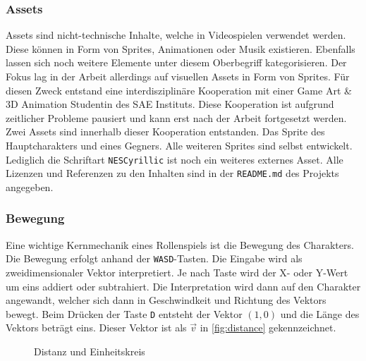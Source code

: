 \subsubsection{Assets}
Assets sind nicht-technische Inhalte, welche in Videospielen verwendet werden.
Diese können in Form von Sprites, Animationen oder Musik existieren.
Ebenfalls lassen sich noch weitere Elemente unter diesem Oberbegriff kategorisieren.
Der Fokus lag in der Arbeit allerdings auf visuellen Assets in Form von Sprites.
Für diesen Zweck entstand eine interdisziplinäre Kooperation mit einer Game Art \& 3D Animation Studentin des SAE Instituts\cite{sae-institute}.
Diese Kooperation ist aufgrund zeitlicher Probleme pausiert und kann erst nach der Arbeit fortgesetzt werden.
Zwei Assets sind innerhalb dieser Kooperation entstanden.
Das Sprite des Hauptcharakters und eines Gegners.
Alle weiteren Sprites sind selbst entwickelt.
Lediglich die Schriftart \texttt{NESCyrillic} ist noch ein weiteres externes Asset.
Alle Lizenzen und Referenzen zu den Inhalten sind in der \texttt{README.md} des Projekts angegeben.

\subsubsection{Bewegung}
Eine wichtige Kernmechanik eines Rollenspiels ist die Bewegung des Charakters.
Die Bewegung erfolgt anhand der \texttt{WASD}-Tasten.
Die Eingabe wird als zweidimensionaler Vektor interpretiert.
Je nach Taste wird der X- oder Y-Wert um eins addiert oder subtrahiert.
Die Interpretation wird dann auf den Charakter angewandt, welcher sich dann in Geschwindkeit und Richtung des Vektors bewegt.
Beim Drücken der Taste \texttt{D} entsteht der Vektor $(1, 0)$ und die Länge des Vektors beträgt eins.
Dieser Vektor ist als $\vec{v}$ in \autoref{fig:distance} gekennzeichnet.\\

\begin{figure}[ht]
    \centering
    \caption{Distanz und Einheitskreis}
    \label{fig:distance}
\end{figure}

